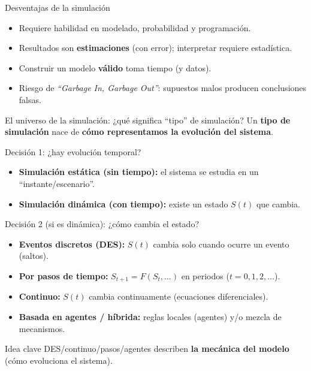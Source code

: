 \documentclass[aspectratio=1610, 9pt]{beamer}
\begin{document}
\begin{frame}{Desventajas de la simulación}
\begin{itemize}
  \item Requiere habilidad en modelado, probabilidad y programación.
  \item Resultados son \textbf{estimaciones} (con error); interpretar requiere estadística.
  \item Construir un modelo \textbf{válido} toma tiempo (y datos).
  \item Riesgo de \emph{``Garbage In, Garbage Out''}: supuestos malos producen conclusiones falsas.
\end{itemize}
\end{frame}






\begin{frame}{El universo de la simulación: ¿qué significa “tipo” de simulación?}
Un \textbf{tipo de simulación} nace de \textbf{cómo representamos la evolución del sistema}.

\vspace{0.3cm}
\begin{block}{Decisión 1: ¿hay evolución temporal?}
\begin{itemize}
  \item \textbf{Simulación estática (sin tiempo):} el sistema se estudia en un “instante/escenario”.
  \item \textbf{Simulación dinámica (con tiempo):} existe un estado $S(t)$ que cambia.
\end{itemize}
\end{block}

\begin{block}{Decisión 2 (si es dinámica): ¿cómo cambia el estado?}
\begin{itemize}
  \item \textbf{Eventos discretos (DES):} $S(t)$ cambia solo cuando ocurre un evento (saltos).
  \item \textbf{Por pasos de tiempo:} $S_{t+1}=F(S_t,\ldots)$ en periodos ($t=0,1,2,\dots$).
  \item \textbf{Continuo:} $S(t)$ cambia continuamente (ecuaciones diferenciales).
  \item \textbf{Basada en agentes / híbrida:} reglas locales (agentes) y/o mezcla de mecanismos.
\end{itemize}
\end{block}

\begin{alertblock}{Idea clave}
DES/continuo/pasos/agentes describen \textbf{la mecánica del modelo} (cómo evoluciona el sistema).
\end{alertblock}
\end{frame}
\end{document}
